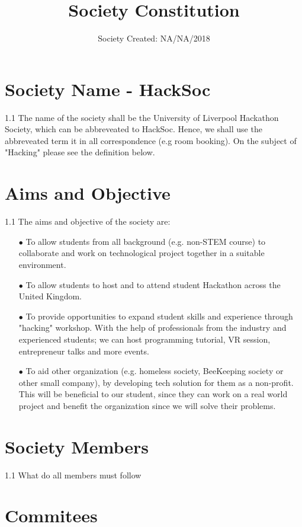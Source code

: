 \documentclass{report}
\title{Society Constitution}
\date{Society Created: NA/NA/2018}
\begin{document}
  
  \maketitle
  
  \section{Society Name - HackSoc}
  1.1 The name of the society shall be the University of Liverpool Hackathon Society, which can be abbreveated to HackSoc. Hence, we shall use the abbreveated term it in all correspondence (e.g room booking). On the subject of "Hacking" 
  please see the definition below.
  
  \section{Aims and Objective}
  1.1 The aims and objective of the society are:
  \begin{itemize}
    \item[$\bullet$]To allow students from all background (e.g. non-STEM course) to collaborate and work on technological project together in a suitable environment.
    
    \item[$\bullet$] To allow students to host and to attend student Hackathon across the United Kingdom.
    
    \item[$\bullet$] To provide opportunities to expand student skills and experience through "hacking" workshop. With the help of professionals from the industry and experienced students; we can host programming tutorial, VR session, entrepreneur talks and more events.
     
    \item[$\bullet$] To aid other organization (e.g. homeless society, BeeKeeping society or other small company), by developing tech solution for them as a non-profit. This will be beneficial to our student, since they can work on a real world project and benefit the organization since we will solve their problems.
  \end{itemize}
  
  
  \section{Society Members}
  1.1 What do all members must follow
  
  \section{Commitees}
  
\end{document}
